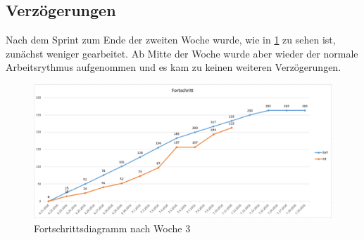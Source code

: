 \subsection{Verzögerungen}
Nach dem Sprint zum Ende der zweiten Woche wurde, wie in \ref{fig:week_three_diagram} zu sehen ist, zunächst weniger gearbeitet. Ab Mitte der Woche wurde aber wieder der normale Arbeitsrythmus aufgenommen und es kam zu keinen weiteren Verzögerungen.
\begin{figure}[!htbp]
	\centering
	\includegraphics[width=380pt]{resourcen/week_three_diagram.PNG}
	\caption{Fortschrittsdiagramm nach Woche 3}
	\label{fig:week_three_diagram}
\end{figure}

\newpage

